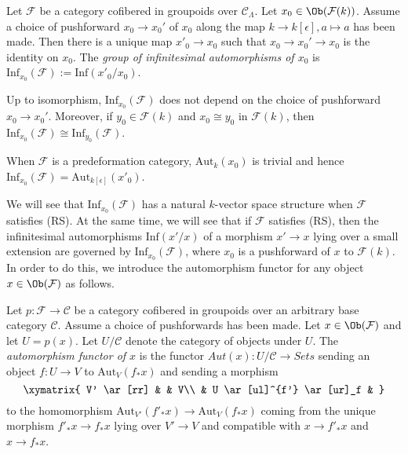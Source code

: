 \begin{definition}
\label{definition-infinitesimal-auts}
Let $\mathcal{F}$ be a category cofibered in groupoids over $\mathcal
C_\Lambda$. Let $x_0 \in \Ob(\mathcal{F}(k))$. Assume a choice of
pushforward $x_0 \to x_0'$ of $x_0$ along the map
$k \to k[\epsilon], a \mapsto a$ has been made.
Then there is a unique map $x'_0 \to x_0$ such that
$x_0 \to x_0' \to x_0$ is the identity on $x_0$.
The {\it group of infinitesimal automorphisms of $x_0$}
is $\text{Inf}_{x_0}(\mathcal F) := \text{Inf}(x'_0/x_0)$.
\end{definition}

\begin{remark}
\label{remark-choice-pushforward-immaterial-infinitesimal-aut}
Up to isomorphism, $\text{Inf}_{x_0}(\mathcal{F})$ does not depend on the
choice of pushforward $x_0 \to x_0'$.  Moreover, if $y_0 \in \mathcal
F(k)$ and $x_0 \cong y_0$ in $\mathcal{F}(k)$, then
$\text{Inf}_{x_0}(\mathcal{F}) \cong \text{Inf}_{y_0}(\mathcal{F})$.
\end{remark}

\begin{remark}
\label{remark-trivial-aut-point}
When $\mathcal{F}$ is a predeformation category, $\text{Aut}_k(x_0)$ is
trivial and hence $\text{Inf}_{x_0}(\mathcal{F}) =
\text{Aut}_{k[\epsilon]}(x'_0)$.
\end{remark}

\noindent
We will see that $\text{Inf}_{x_0}(\mathcal{F})$ has a natural $k$-vector
space structure when $\mathcal{F}$ satisfies (RS). At the same time, we will
see that if $\mathcal{F}$ satisfies (RS), then the infinitesimal automorphisms
$\text{Inf}(x'/x)$ of a morphism $x' \to x$ lying over a small
extension are governed by $\text{Inf}_{x_0}(\mathcal{F})$, where $x_0$ is
a pushforward of $x$ to $\mathcal{F}(k)$. In order to do this, we introduce
the automorphism functor for any object $x \in \Ob(\mathcal{F})$ as
follows.

\begin{definition}
\label{definition-automorphism-functor}
Let $p : \mathcal{F} \to \mathcal{C}$ be a category cofibered in groupoids
over an arbitrary base category $\mathcal{C}$. Assume a choice of pushforwards
has been made. Let $x \in \Ob(\mathcal{F})$ and let $U = p(x)$.
Let $U/\mathcal{C}$ denote the category of objects under $U$. The
{\it automorphism functor of $x$} is the functor
$\mathit{Aut}(x) : U/\mathcal{C} \to \textit{Sets}$ sending an object
$f : U \to V$ to $\text{Aut}_V(f_*x)$ and sending a morphism
$$
\xymatrix{
V' \ar[rr] &                    & V\\
          & U \ar[ul]^{f'}  \ar[ur]_f &
}
$$
to the homomorphism
$\text{Aut}_{V'}(f'_*x) \to \text{Aut}_V(f_*x)$
coming from the unique morphism $f'_*x \to f_*x$ lying over
$V' \to V$ and compatible with $x \to f'_*x$ and $x \to f_*x$.
\end{definition}

